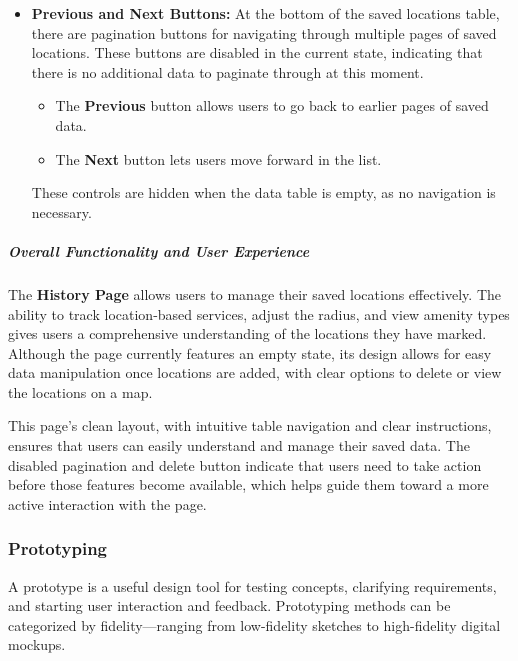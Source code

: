 \begin{itemize}
    \item{} \textbf{Previous and Next Buttons:} At the bottom of the saved
    locations table, there are pagination buttons for navigating through
    multiple pages of saved locations. These buttons are disabled in the current
    state, indicating that there is no additional data to paginate through at
    this moment.
    \begin{itemize}
        \item{} The \textbf{Previous} button allows users to go back to earlier
        pages of saved data.
        \item{} The \textbf{Next} button lets users move forward in the list.
    \end{itemize}
    These controls are hidden when the data table is empty, as no navigation is
    necessary.
\end{itemize}

\subparagraph{Overall Functionality and User Experience}\mbox{}

The \textbf{History Page} allows users to manage their saved locations
effectively. The ability to track location{-}based services, adjust the radius,
and view amenity types gives users a comprehensive understanding of the
locations they have marked. Although the page currently features an empty state,
its design allows for easy data manipulation once locations are added, with
clear options to delete or view the locations on a map.

This page's clean layout, with intuitive table navigation and clear
instructions, ensures that users can easily understand and manage their saved
data. The disabled pagination and delete button indicate that users need to take
action before those features become available, which helps guide them toward a
more active interaction with the page.


\subsubsection{Prototyping}
A prototype is a useful design tool for testing concepts, clarifying
requirements, and starting user interaction and feedback. Prototyping methods
can be categorized by fidelity—ranging from low-fidelity sketches to
high-fidelity digital mockups.


